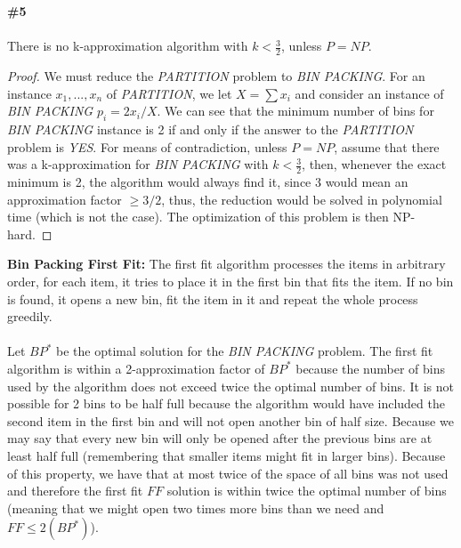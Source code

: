 \documentclass{article}
\begin{document}
\newpage
\textbf{\#5}
\\
\\
There is no k-approximation algorithm with $k < \frac{3}{2}$, unless $P = NP$.
\begin{proof}
We must reduce the \textit{PARTITION} problem to \textit{BIN PACKING}. For an instance $x_1, ..., x_n$ of \textit{PARTITION}, we let $X = \sum x_i$ and consider an instance of \textit{BIN PACKING} $p_i = 2x_i/X$. We can see that the minimum number of bins for \textit{BIN PACKING} instance is 2 if and only if the answer to the \textit{PARTITION} problem is \textit{YES}. For means of contradiction, unless $P = NP$, assume that there was a k-approximation for \textit{BIN PACKING} with $k < \frac{3}{2}$, then, whenever the exact minimum is 2, the algorithm would always find it, since $3$ would mean an approximation factor $\geq 3/2$, thus, the reduction would be solved in polynomial time (which is not the case). The optimization of this problem is then NP-hard.
\end{proof}
\textbf{Bin Packing First Fit:} The first fit algorithm processes the items in arbitrary order, for each item, it tries to place it in the first bin that fits the item. If no bin is found, it opens a new bin, fit the item in it and repeat the whole process greedily.
\\
\\
Let $BP^*$ be the optimal solution for the \textit{BIN PACKING} problem. The first fit algorithm is within a 2-approximation factor of $BP^*$ because the number of bins used by the algorithm does not exceed twice the optimal number of bins. It is not possible for 2 bins to be half full because the algorithm would have included the second item in the first bin and will not open another bin of half size. Because we may say that every new bin will only be opened after the previous bins are at least half full (remembering that smaller items might fit in larger bins). Because of this property, we have that at most twice of the space of all bins was not used and therefore the first fit $FF$ solution is within twice the optimal number of bins (meaning that we might open two times more bins than we need and $FF \leq 2(BP^*)$).
\end{document}
